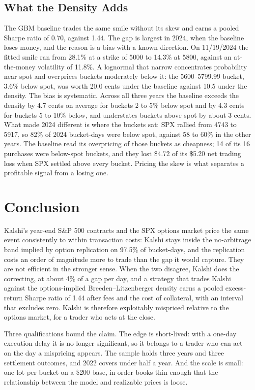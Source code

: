 \documentclass{article}
\begin{document}
\subsection{What the Density Adds}\label{sec:gbm2024}
The GBM baseline trades the same smile without its skew and earns a pooled Sharpe ratio of 0.70, against 1.44. The gap is largest in 2024, when the baseline loses money, and the reason is a bias with a known direction. On 11/19/2024 the fitted smile ran from 28.1\% at a strike of 5000 to 14.3\% at 5800, against an at-the-money volatility of 11.8\%. A lognormal that narrow concentrates probability near spot and overprices buckets moderately below it: the 5600--5799.99 bucket, 3.6\% below spot, was worth 20.0 cents under the baseline against 10.5 under the density. The bias is systematic. Across all three years the baseline exceeds the density by 4.7 cents on average for buckets 2 to 5\% below spot and by 4.3 cents for buckets 5 to 10\% below, and understates buckets above spot by about 3 cents. What made 2024 different is where the buckets sat: SPX rallied from 4743 to 5917, so 82\% of 2024 bucket-days were below spot, against 58 to 60\% in the other years. The baseline read its overpricing of those buckets as cheapness; 14 of its 16 purchases were below-spot buckets, and they lost \$4.72 of its \$5.20 net trading loss when SPX settled above every bucket. Pricing the skew is what separates a profitable signal from a losing one.

\section{Conclusion}\label{sec:conclusion}
Kalshi's year-end S\&P 500 contracts and the SPX options market price the same event consistently to within transaction costs: Kalshi stays inside the no-arbitrage band implied by option replication on 97.5\% of bucket-days, and the replication costs an order of magnitude more to trade than the gap it would capture. They are not efficient in the stronger sense. When the two disagree, Kalshi does the correcting, at about 4\% of a gap per day, and a strategy that trades Kalshi against the options-implied Breeden--Litzenberger density earns a pooled excess-return Sharpe ratio of 1.44 after fees and the cost of collateral, with an interval that excludes zero. Kalshi is therefore exploitably mispriced relative to the options market, for a trader who acts at the close.

Three qualifications bound the claim. The edge is short-lived: with a one-day execution delay it is no longer significant, so it belongs to a trader who can act on the day a mispricing appears. The sample holds three years and three settlement outcomes, and 2022 covers under half a year. And the scale is small: one lot per bucket on a \$200 base, in order books thin enough that the relationship between the model and realizable prices is loose.
\end{document}
